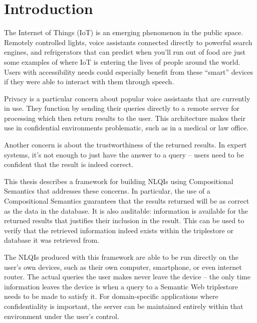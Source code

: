 \documentclass[../main.tex]{subfiles}
\begin{document}
\chapter{Introduction}
\begin{refsection}

\label{chapter:intro}




The Internet of Things (IoT) is an emerging phenomenon in the public space.  Remotely controlled lights,
voice assistants connected directly to powerful search engines, and refrigerators that can predict
when you'll run out of food are just some examples of where IoT is entering the lives of people around the world.  Users with accessibility needs could especially benefit from these ``smart'' devices if they were able to interact with them through speech.

Privacy is a particular concern about popular voice assistants that are currently in use.
They function by sending their queries directly to a remote server for processing which then
return results to the user.  This architecture makes their use in confidential environments problematic,
such as in a medical or law office.

Another concern is about the trustworthiness of the returned results.  In expert systems,
it's not enough to just have the answer to a query -- users need to be confident that the
result is indeed correct.

This thesis describes a framework for building NLQIs using Compositional Semantics that addresses these concerns.  In particular, the use of a Compositional Semantics
guarantees that the results returned will be as correct as the data in the database.
It is also auditable: information is available for the returned results that justifies their inclusion in the result.  This can be used to verify that the retrieved information indeed exists within the triplestore or database it was retrieved from.

The NLQIs produced with this framework are able to be run directly on the user's own devices,
such as their own computer, smartphone, or even internet router.  The actual queries the user
makes never leave the device -- the only time information leaves the device is when a query to
a Semantic Web triplestore needs to be made to satisfy it.  For domain-specific applications
where confidentiality is important, the server can be maintained entirely within that environment
under the user's control.


\end{refsection}
\end{document}
